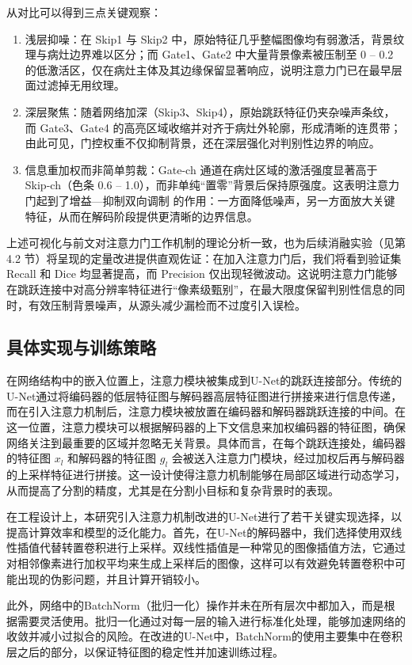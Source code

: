 从对比可以得到三点关键观察：

\begin{enumerate}
    \item 浅层抑噪：在 Skip1 与 Skip2 中，原始特征几乎整幅图像均有弱激活，背景纹理与病灶边界难以区分；而 Gate1、Gate2 中大量背景像素被压制至 0 – 0.2 的低激活区，仅在病灶主体及其边缘保留显著响应，说明注意力门已在最早层面过滤掉无用纹理。
    
    \item 深层聚焦：随着网络加深（Skip3、Skip4），原始跳跃特征仍夹杂噪声条纹，而 Gate3、Gate4 的高亮区域收缩并对齐于病灶外轮廓，形成清晰的连贯带；由此可见，门控权重不仅抑制背景，还在深层强化对判别性边界的响应。
    
    \item 信息重加权而非简单剪裁：Gate-ch 通道在病灶区域的激活强度显著高于 Skip-ch（色条 0.6 – 1.0），而非单纯“置零”背景后保持原强度。这表明注意力门起到了增益—抑制双向调制 的作用：一方面降低噪声，另一方面放大关键特征，从而在解码阶段提供更清晰的边界信息。
\end{enumerate}

上述可视化与前文对注意力门工作机制的理论分析一致，也为后续消融实验（见第 4.2 节）将呈现的定量改进提供直观佐证：在加入注意力门后，我们将看到验证集 Recall 和 Dice 均显著提高，而 Precision 仅出现轻微波动。这说明注意力门能够在跳跃连接中对高分辨率特征进行“像素级甄别”，在最大限度保留判别性信息的同时，有效压制背景噪声，从源头减少漏检而不过度引入误检。

\subsection{具体实现与训练策略}

在网络结构中的嵌入位置上，注意力模块被集成到U-Net的跳跃连接部分。传统的U-Net通过将编码器的低层特征图与解码器高层特征图进行拼接来进行信息传递，而在引入注意力机制后，注意力模块被放置在编码器和解码器跳跃连接的中间。在这一位置，注意力模块可以根据解码器的上下文信息来加权编码器的特征图，确保网络关注到最重要的区域并忽略无关背景。具体而言，在每个跳跃连接处，编码器的特征图 $x_l$ 和解码器的特征图 $g_l$ 会被送入注意力门模块，经过加权后再与解码器的上采样特征进行拼接。这一设计使得注意力机制能够在局部区域进行动态学习，从而提高了分割的精度，尤其是在分割小目标和复杂背景时的表现。

在工程设计上，本研究引入注意力机制改进的U-Net进行了若干关键实现选择，以提高计算效率和模型的泛化能力。首先，在U-Net的解码器中，我们选择使用双线性插值代替转置卷积进行上采样。双线性插值是一种常见的图像插值方法，它通过对相邻像素进行加权平均来生成上采样后的图像，这样可以有效避免转置卷积中可能出现的伪影问题，并且计算开销较小。

此外，网络中的BatchNorm（批归一化）操作并未在所有层次中都加入，而是根据需要灵活使用。批归一化通过对每一层的输入进行标准化处理，能够加速网络的收敛并减小过拟合的风险。在改进的U-Net中，BatchNorm的使用主要集中在卷积层之后的部分，以保证特征图的稳定性并加速训练过程。